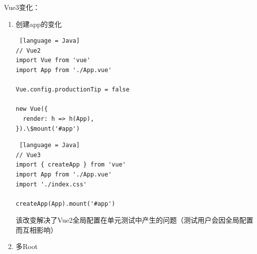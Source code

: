 Vue3变化：
\begin{enumerate}
  \item 创建app的变化
        \begin{lstlisting} [language = Java]
// Vue2
import Vue from 'vue'
import App from './App.vue'

Vue.config.productionTip = false

new Vue({
  render: h => h(App),
}).\$mount('#app')
    \end{lstlisting}
        \begin{lstlisting} [language = Java]
// Vue3
import { createApp } from 'vue'
import App from './App.vue'
import './index.css'

createApp(App).mount('#app')
    \end{lstlisting}
        该改变解决了Vue2全局配置在单元测试中产生的问题（测试用户会因全局配置而互相影响）
  \item 多Root
  

\end{enumerate}

